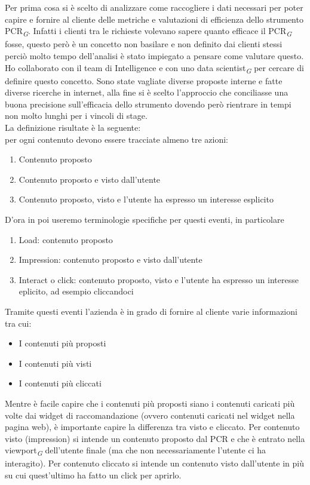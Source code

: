\documentclass[a4paper, 12pt, twoside, openright]{book}
\newcommand{\gloss}[1]{#1\textsubscript{\textit{\tiny{G}}}}
\begin{document}
Per prima cosa si è scelto di analizzare come raccogliere i dati necessari per poter capire e fornire al cliente delle metriche e valutazioni di efficienza dello strumento \gloss{PCR}. Infatti i clienti tra le richieste volevano sapere quanto efficace il \gloss{PCR} fosse, questo però è un concetto non basilare e non definito dai clienti stessi perciò molto tempo dell'analisi è stato impiegato a pensare come valutare questo.\\
Ho collaborato con il team di Intelligence e con uno \gloss{data scientist} per cercare di definire questo concetto. Sono state vagliate diverse proposte interne e fatte diverse ricerche in internet, alla fine si è scelto l'approccio che conciliasse una buona precisione sull'efficacia dello strumento dovendo però rientrare in tempi non molto lunghi per i vincoli di stage.\\
La definizione risultate è la seguente:\\
per ogni contenuto devono essere tracciate almeno tre azioni:
\begin{enumerate}
\item Contenuto proposto
\item Contenuto proposto e visto dall'utente
\item Contenuto proposto, visto e l'utente ha espresso un interesse esplicito
\end{enumerate}
D'ora in poi useremo terminologie specifiche per questi eventi, in particolare
\begin{enumerate}
\item Load: contenuto proposto
\item Impression: contenuto proposto e visto dall'utente
\item Interact o click: contenuto proposto, visto e l'utente ha espresso un interesse eplicito, ad esempio cliccandoci
\end{enumerate}
Tramite questi eventi l'azienda è in grado di fornire al cliente varie informazioni tra cui:
\begin{itemize}
\item I contenuti più proposti
\item I contenuti più visti
\item I contenuti più cliccati
\end{itemize}
Mentre è facile capire che i contenuti più proposti siano i contenuti caricati più volte dai widget di raccomandazione (ovvero contenuti caricati nel widget nella pagina web), è importante capire la differenza tra visto e cliccato. Per contenuto visto (impression) si intende un contenuto proposto dal PCR e che è entrato nella \gloss{viewport} dell'utente finale (ma che non necessariamente l'utente ci ha interagito). Per contenuto cliccato si intende un contenuto visto dall'utente in più su cui quest'ultimo ha fatto un click per aprirlo.\\
\end{document}

